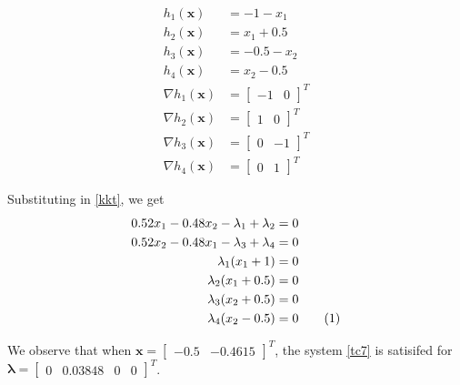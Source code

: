 \documentclass[a4paper]{article}
\newcommand{\numberthis}{\addtocounter{equation}{1}\tag{\theequation}}
\newcommand{\labeleqn}[1]{\numberthis \label{#1}}
\begin{document}
\begin{align*}
h_1(\textbf{x}) &= -1 - x_1 \\
h_2(\textbf{x}) &= x_1 + 0.5 \\
h_3(\textbf{x}) &= -0.5 - x_2 \\
h_4(\textbf{x}) &= x_2 - 0.5 \\
\nabla h_1(\textbf{x}) &= \begin{bmatrix} -1 & 0 \end{bmatrix} ^T \\
\nabla h_2(\textbf{x}) &= \begin{bmatrix} 1 & 0 \end{bmatrix} ^T \\
\nabla h_3(\textbf{x}) &= \begin{bmatrix} 0 & -1 \end{bmatrix} ^T \\
\nabla h_4(\textbf{x}) &= \begin{bmatrix} 0 & 1 \end{bmatrix} ^T
\end{align*}

Substituting in \eqref{kkt}, we get
\begin{align*}
0.52 x_1 - 0.48 x_2 - \lambda_1 + \lambda_2 &= 0 \\
0.52 x_2 - 0.48 x_1 - \lambda_3 + \lambda_4 &= 0 \\
\lambda_1 (x_1 + 1) &= 0 \\
\lambda_2 (x_1 + 0.5) &= 0 \\
\lambda_3 (x_2 + 0.5) &= 0 \\
\lambda_4 (x_2 - 0.5) &= 0 \labeleqn{tc7}
\end{align*}

We observe that when $\textbf{x} = \begin{bmatrix} -0.5 & -0.4615 \end{bmatrix} ^T$, the system \eqref{tc7} is satisifed for $\boldsymbol{\lambda} = \begin{bmatrix} 0 & 0.03848 & 0 & 0 \end{bmatrix} ^T$.
\end{document}
